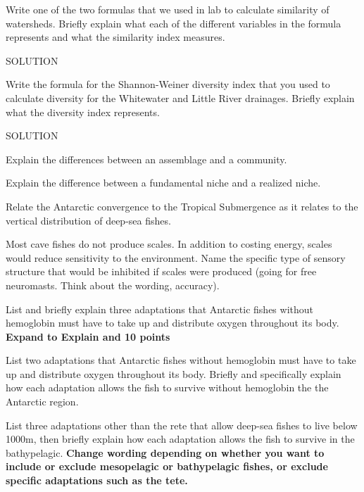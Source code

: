 \question[10]
Write one of the two formulas that we used in lab to calculate similarity of watersheds. Briefly explain what each of the different variables in the formula represents and what the similarity index measures.
\begin{solution}SOLUTION\end{solution}


\question[10]
Write the formula for the Shannon-Weiner diversity index that you used to calculate diversity for the Whitewater and Little River drainages. Briefly explain what the diversity index represents.
\begin{solution}SOLUTION\end{solution}



\question[5]
Explain the differences between an assemblage and a community.

\question[5]
Explain the difference between a fundamental niche and a realized niche.

\question[10]
Relate the Antarctic convergence to the Tropical Submergence as it relates to the vertical distribution of deep-sea fishes.

\question[5]
Most cave fishes do not produce scales. In addition to costing energy, scales would reduce sensitivity to the environment. Name the specific type of sensory structure that would be inhibited if scales were produced (going for free neuromasts. Think about the wording, accuracy).

\question[5]
List and briefly explain three adaptations that Antarctic fishes without hemoglobin must have to take up and distribute oxygen throughout its body. \textbf{Expand to Explain and 10 points}

\question[10]
List two adaptations that Antarctic fishes without hemoglobin must have to take up and distribute oxygen throughout its body. Briefly and specifically explain how each adaptation allows the fish to survive without hemoglobin the the Antarctic region.



\question[10]
List three adaptations other than the rete that allow deep-sea fishes to live below 1000m, then briefly explain how each adaptation allows the fish to survive in the bathypelagic. \textbf{Change wording depending on whether you want to include or exclude mesopelagic or bathypelagic fishes, or exclude specific adaptations such as the tete.}

